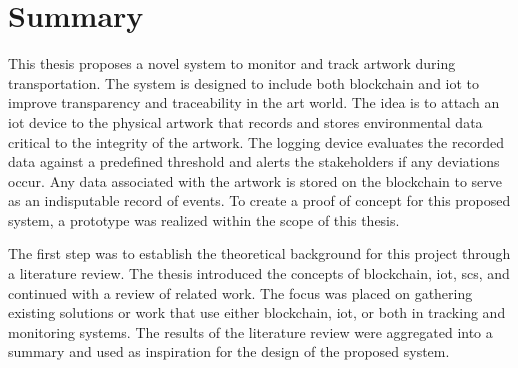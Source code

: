 

\section{Summary}
This thesis proposes a novel system to monitor and track artwork during transportation. The system is designed to include both blockchain and \gls{iot} to improve transparency and traceability in the art world. The idea is to attach an \gls{iot} device to the physical artwork that records and stores environmental data critical to the integrity of the artwork. The logging device evaluates the recorded data against a predefined threshold and alerts the stakeholders if any deviations occur. Any data associated with the artwork is stored on the blockchain to serve as an indisputable record of events. To create a proof of concept for this proposed system, a prototype was realized within the scope of this thesis.

The first step was to establish the theoretical background for this project through a literature review. The thesis introduced the concepts of blockchain, \gls{iot}, \glspl{sc}, and continued with a review of related work. The focus was placed on gathering existing solutions or work that use either blockchain, \gls{iot}, or both in tracking and monitoring systems. The results of the literature review were aggregated into a summary and used as inspiration for the design of the proposed system.

